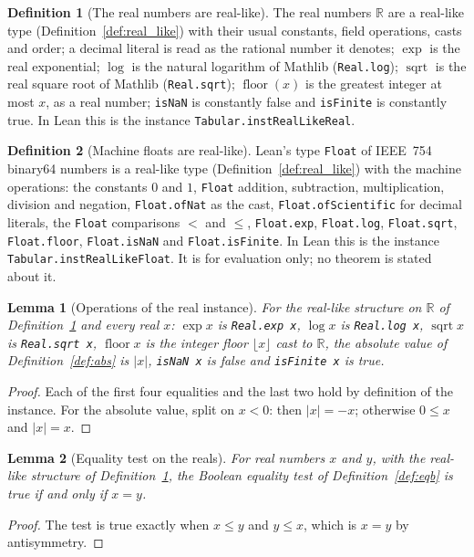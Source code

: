 \documentclass[11pt,a4paper]{article}
\theoremstyle{definition}
\newtheorem{definition}{Definition}
\theoremstyle{plain}
\newtheorem{lemma}{Lemma}
\theoremstyle{remark}
\newcommand{\R}{\mathbb{R}}
\newcommand{\code}[1]{\texttt{#1}}
\begin{document}
\begin{definition}[The real numbers are real-like]\label{def:real_like_real}
The real numbers $\R$ are a real-like type (Definition~\ref{def:real_like}) with their usual
constants, field operations, casts and order; a decimal literal is read as the rational number
it denotes; $\exp$ is the real exponential; $\log$ is the natural logarithm of Mathlib
(\code{Real.log}); $\operatorname{sqrt}$ is the real square root of Mathlib (\code{Real.sqrt});
$\operatorname{floor}(x)$ is the greatest integer at most $x$, as a real number; \code{isNaN}
is constantly false and \code{isFinite} is constantly true. In Lean this is the instance
\code{Tabular.instRealLikeReal}.
\end{definition}

\begin{definition}[Machine floats are real-like]\label{def:real_like_float}
Lean's type \code{Float} of IEEE~754 binary64 numbers is a real-like type
(Definition~\ref{def:real_like}) with the machine operations: the constants $0$ and $1$,
\code{Float} addition, subtraction, multiplication, division and negation, \code{Float.ofNat}
as the cast, \code{Float.ofScientific} for decimal literals, the \code{Float} comparisons $<$
and $\le$, \code{Float.exp}, \code{Float.log}, \code{Float.sqrt}, \code{Float.floor},
\code{Float.isNaN} and \code{Float.isFinite}. In Lean this is the instance
\code{Tabular.instRealLikeFloat}. It is for evaluation only; no theorem is stated about it.
\end{definition}

\begin{lemma}[Operations of the real instance]\label{lem:real_ops}
For the real-like structure on $\R$ of Definition~\ref{def:real_like_real} and every real $x$:
$\exp x$ is \code{Real.exp x}, $\log x$ is \code{Real.log x}, $\operatorname{sqrt} x$ is
\code{Real.sqrt x}, $\operatorname{floor} x$ is the integer floor $\lfloor x \rfloor$ cast to
$\R$, the absolute value of Definition~\ref{def:abs} is $|x|$, \code{isNaN x} is false and
\code{isFinite x} is true.
\end{lemma}
\begin{proof}
Each of the first four equalities and the last two hold by definition of the instance. For the
absolute value, split on $x < 0$: then $|x| = -x$; otherwise $0 \le x$ and $|x| = x$.
\end{proof}

\begin{lemma}[Equality test on the reals]\label{lem:eqb_real}
For real numbers $x$ and $y$, with the real-like structure of
Definition~\ref{def:real_like_real}, the Boolean equality test of Definition~\ref{def:eqb} is
true if and only if $x = y$.
\end{lemma}
\begin{proof}
The test is true exactly when $x \le y$ and $y \le x$, which is $x = y$ by antisymmetry.
\end{proof}
\end{document}
